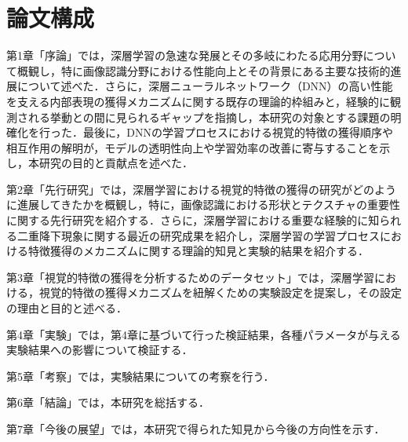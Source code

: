 \section{論文構成}
第1章「序論」では，深層学習の急速な発展とその多岐にわたる応用分野について概観し，特に画像認識分野における性能向上とその背景にある主要な技術的進展について述べた．さらに，深層ニューラルネットワーク（DNN）の高い性能を支える内部表現の獲得メカニズムに関する既存の理論的枠組みと，経験的に観測される挙動との間に見られるギャップを指摘し，本研究の対象とする課題の明確化を行った．最後に，DNNの学習プロセスにおける視覚的特徴の獲得順序や相互作用の解明が，モデルの透明性向上や学習効率の改善に寄与することを示し，本研究の目的と貢献点を述べた．\par
第2章「先行研究」では，深層学習における視覚的特徴の獲得の研究がどのように進展してきたかを概観し，特に，画像認識における形状とテクスチャの重要性に関する先行研究を紹介する．さらに，深層学習における重要な経験的に知られる二重降下現象に関する最近の研究成果を紹介し，深層学習の学習プロセスにおける特徴獲得のメカニズムに関する理論的知見と実験的結果を紹介する．\par
第3章「視覚的特徴の獲得を分析するためのデータセット」では，深層学習における，視覚的特徴の獲得メカニズムを紐解くための実験設定を提案し，その設定の理由と目的と述べる．\par
第4章「実験」では，第4章に基づいて行った検証結果，各種パラメータが与える実験結果への影響について検証する．\par
第5章「考察」では，実験結果についての考察を行う．\par
第6章「結論」では，本研究を総括する．\par
第7章「今後の展望」では，本研究で得られた知見から今後の方向性を示す．\par
\newpage